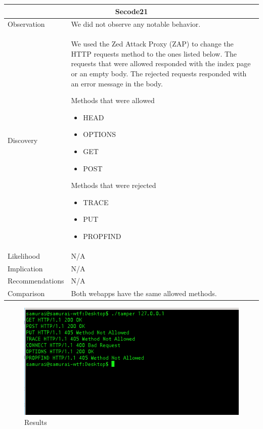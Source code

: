 \documentclass[headsepline,footsepline,footinclude=false,oneside,fontsize=11pt,paper=a4,listof=totoc,bibliography=totoc]{scrbook} %
\begin{document}
\begin{tabular}{ l|p{11cm}  }
	\hline
	\multicolumn{2}{c}{\textbf{Secode21}} \\
	\hline
	Observation   &  We did not observe any notable behavior.  \\
	Discovery  &  We used the Zed  Attack  Proxy  (ZAP)	to change the HTTP requests method to the ones listed below. The requests that were allowed responded
	with the index page or an empty body. The rejected requests responded with an
	error message in the body.\

	Methods that were allowed\

	\begin{itemize}
		\item HEAD
		\item OPTIONS
		\item GET
		\item POST

	\end{itemize}

	Methods that were rejected\

	\begin{itemize}
		\item TRACE
		\item PUT
		\item PROPFIND
	\end{itemize} \\

	Likelihood & N/A \\
	Implication    & N/A \\
	Recommendations & N/A \\
	Comparison &  Both webapps have the same allowed methods.\\
	\hline
\end{tabular}

\begin{figure}
	\includegraphics[width=\linewidth]{tampering.png}
	\caption{Results}
	\label{fig:test}
\end{figure}
\end{document}
